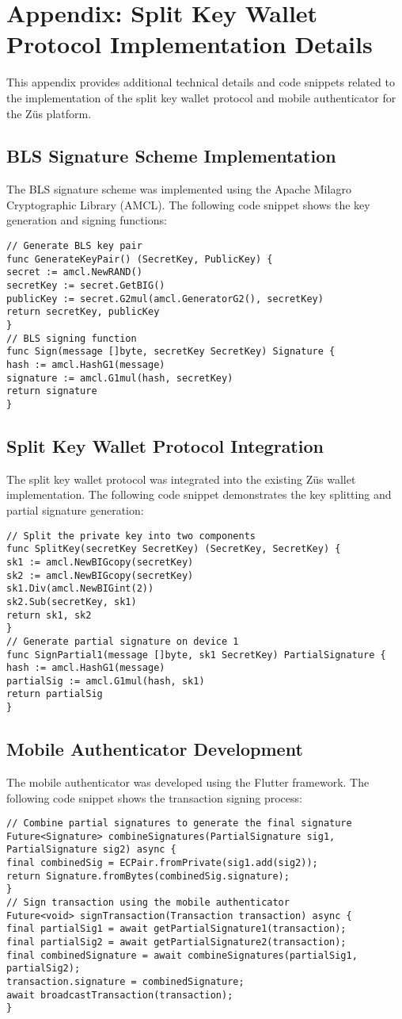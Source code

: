 \chapter*{Appendix: Split Key Wallet Protocol Implementation Details}
\label{AppendixA}
This appendix provides additional technical details and code snippets related to the implementation of the split key wallet protocol and mobile authenticator for the Züs platform.
\section*{BLS Signature Scheme Implementation}
The BLS signature scheme was implemented using the Apache Milagro Cryptographic Library (AMCL). The following code snippet shows the key generation and signing functions:
\begin{verbatim}
// Generate BLS key pair
func GenerateKeyPair() (SecretKey, PublicKey) {
secret := amcl.NewRAND()
secretKey := secret.GetBIG()
publicKey := secret.G2mul(amcl.GeneratorG2(), secretKey)
return secretKey, publicKey
}
// BLS signing function
func Sign(message []byte, secretKey SecretKey) Signature {
hash := amcl.HashG1(message)
signature := amcl.G1mul(hash, secretKey)
return signature
}
\end{verbatim}
\section*{Split Key Wallet Protocol Integration}
The split key wallet protocol was integrated into the existing Züs wallet implementation. The following code snippet demonstrates the key splitting and partial signature generation:
\begin{verbatim}
// Split the private key into two components
func SplitKey(secretKey SecretKey) (SecretKey, SecretKey) {
sk1 := amcl.NewBIGcopy(secretKey)
sk2 := amcl.NewBIGcopy(secretKey)
sk1.Div(amcl.NewBIGint(2))
sk2.Sub(secretKey, sk1)
return sk1, sk2
}
// Generate partial signature on device 1
func SignPartial1(message []byte, sk1 SecretKey) PartialSignature {
hash := amcl.HashG1(message)
partialSig := amcl.G1mul(hash, sk1)
return partialSig
}
\end{verbatim}
\section*{Mobile Authenticator Development}
The mobile authenticator was developed using the Flutter framework. The following code snippet shows the transaction signing process:
\begin{verbatim}
// Combine partial signatures to generate the final signature
Future<Signature> combineSignatures(PartialSignature sig1, PartialSignature sig2) async {
final combinedSig = ECPair.fromPrivate(sig1.add(sig2));
return Signature.fromBytes(combinedSig.signature);
}
// Sign transaction using the mobile authenticator
Future<void> signTransaction(Transaction transaction) async {
final partialSig1 = await getPartialSignature1(transaction);
final partialSig2 = await getPartialSignature2(transaction);
final combinedSignature = await combineSignatures(partialSig1, partialSig2);
transaction.signature = combinedSignature;
await broadcastTransaction(transaction);
}
\end{verbatim}
